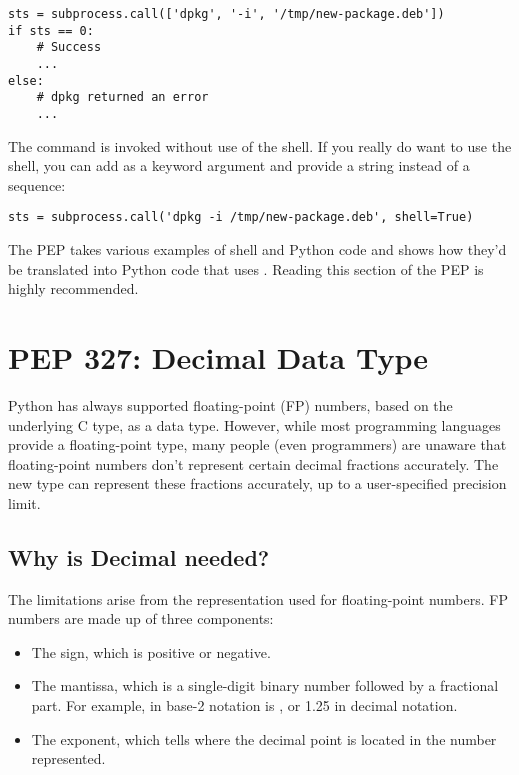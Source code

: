\documentclass{howto}
\begin{document}
\begin{verbatim}
sts = subprocess.call(['dpkg', '-i', '/tmp/new-package.deb'])
if sts == 0:
    # Success
    ...
else:
    # dpkg returned an error
    ...
\end{verbatim}

The command is invoked without use of the shell.  If you really do want to 
use the shell, you can add  as a keyword argument and provide
a string instead of a sequence:

\begin{verbatim}
sts = subprocess.call('dpkg -i /tmp/new-package.deb', shell=True)
\end{verbatim}

The PEP takes various examples of shell and Python code and shows how
they'd be translated into Python code that uses . 
Reading this section of the PEP is highly recommended.

\begin{seealso}
\end{seealso}


\section{PEP 327: Decimal Data Type}

Python has always supported floating-point (FP) numbers, based on the
underlying C  type, as a data type.  However, while most
programming languages provide a floating-point type, many people (even
programmers) are unaware that floating-point numbers don't represent
certain decimal fractions accurately.  The new  type
can represent these fractions accurately, up to a user-specified
precision limit.


\subsection{Why is Decimal needed?}

The limitations arise from the representation used for floating-point numbers.
FP numbers are made up of three components:

\begin{itemize}
\item The sign, which is positive or negative.
\item The mantissa, which is a single-digit binary number  
followed by a fractional part.  For example,  in base-2 notation
is , or 1.25 in decimal notation.
\item The exponent, which tells where the decimal point is located in the number represented.  
\end{itemize}
\end{document}
